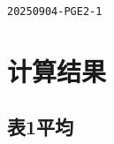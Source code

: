\documentclass[UTF8,10pt,a4paper,fontset=fandol]{ctexart}
\begin{document}

\newpage

\noindent\texttt{20250904-PGE2-1}

\section*{计算结果}

\subsection*{表1\quad 平均}

\end{document}
